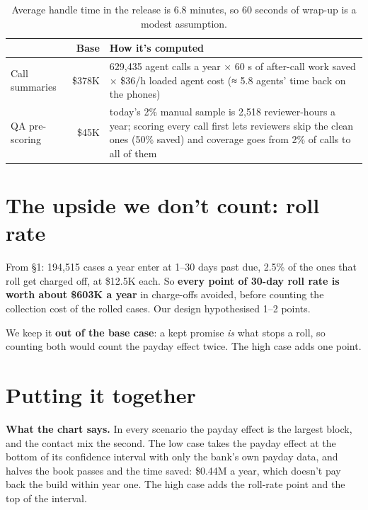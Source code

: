 \documentclass[11pt]{article}
\begin{document}
\begin{table}[H]\small\centering
\begin{tabularx}{\linewidth}{@{}lrL@{}}
\toprule
& \textbf{Base} & \textbf{How it's computed} \\
\midrule
Call summaries & \$378K & 629,435 agent calls a year × 60 s of after-call work saved × \$36/h loaded agent cost (≈ 5.8 agents' time back on the phones) \\
QA pre-scoring & \$45K & today's 2\% manual sample is 2,518 reviewer-hours a year; scoring every call first lets reviewers skip the clean ones (50\% saved) and coverage goes from 2\% of calls to all of them \\
\bottomrule
\end{tabularx}
\caption{Average handle time in the release is 6.8 minutes, so 60 seconds of wrap-up is a modest assumption.}
\end{table}

\section{The upside we don't count: roll rate}

From §1: 194,515 cases a year enter at 1–30 days past due, 2.5\% of the ones that roll get charged off, at \$12.5K each.
So \textbf{every point of 30-day roll rate is worth about \$603K a year} in charge-offs avoided, before counting the
collection cost of the rolled cases. Our design hypothesised 1–2 points.

We keep it \textbf{out of the base case}: a kept promise \emph{is} what stops a roll, so counting both would count the
payday effect twice. The high case adds one point.

\section{Putting it together}


\textbf{What the chart says.} In every scenario the payday effect is the largest block, and the contact mix the second.
The low case takes the payday effect at the bottom of its confidence interval with only the bank's own payday data,
and halves the book passes and the time saved: \$0.44M a year, which doesn't pay back the build within
year one. The high case adds the roll-rate point and the top of the interval.
\end{document}
